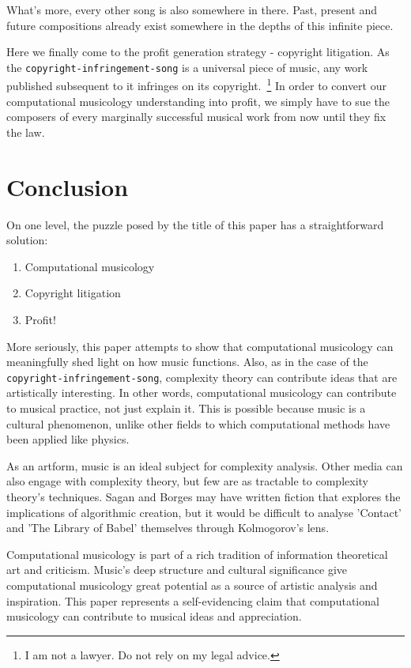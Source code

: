 \documentclass[numbers]{sigplanconf}
\begin{document}
What's more, every other song is also somewhere in there. Past, present and future compositions already exist somewhere in
the depths of this infinite piece.

Here we finally come to the profit generation strategy - copyright litigation. As the \verb|copyright-infringement-song| is
a universal piece of music, any work published subsequent to it infringes on its copyright.~\footnote{I am not a lawyer. Do not rely on my legal advice.} In order to convert our computational musicology understanding into profit, we simply have to sue the composers
of every marginally successful musical work from now until they fix the law.

\section{Conclusion}

On one level, the puzzle posed by the title of this paper has a straightforward solution:
\begin{enumerate}
    \item Computational musicology
    \item Copyright litigation
    \item Profit!
\end{enumerate}

More seriously, this paper attempts to show that computational musicology can meaningfully shed light on how music functions.
Also, as in
the case of the \verb|copyright-infringement-song|, complexity theory can contribute ideas that are artistically interesting.
In other words, computational musicology can contribute to musical practice, not just explain it. This is possible because music
is a cultural phenomenon, unlike other fields to which computational methods have been applied like physics. 

As an artform, music is an ideal subject for complexity analysis. Other media can also engage with complexity theory, but
few are as tractable to complexity theory's techniques. Sagan and Borges may have written fiction that explores the implications
of algorithmic creation, but it would be difficult to analyse 'Contact' and 'The Library of Babel' themselves through
Kolmogorov's lens.

Computational musicology is part of a rich tradition of information theoretical art and criticism. Music's deep structure and
cultural significance give computational musicology great potential as a source of artistic analysis and inspiration.
This paper represents a self-evidencing claim that computational musicology can contribute to musical ideas and appreciation.
\end{document}

